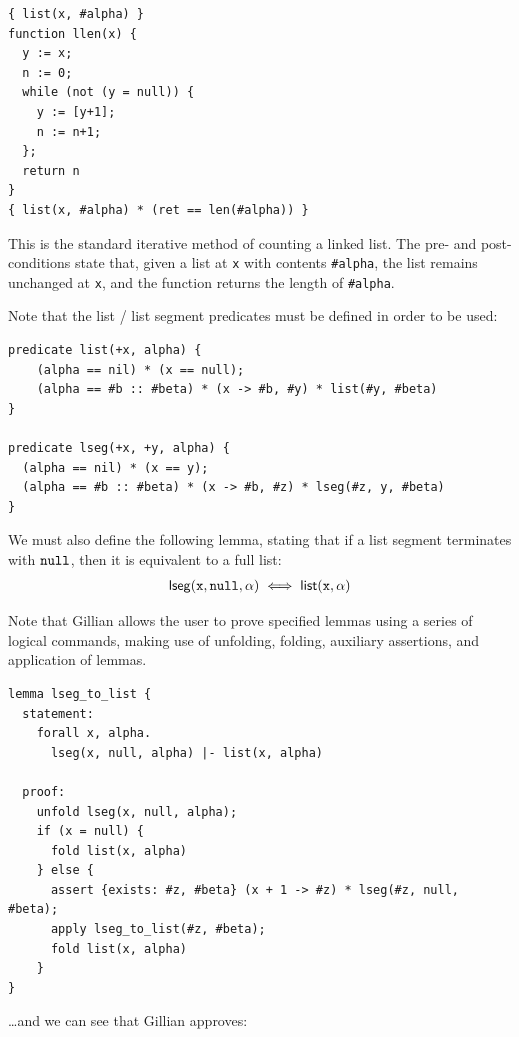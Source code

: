 \begin{lstlisting}[numbers=none, caption={Verification example - list length in WISL}, style=code]
{ list(x, #alpha) }
function llen(x) {
  y := x;
  n := 0;
  while (not (y = null)) {
    y := [y+1];
    n := n+1;
  };
  return n
}
{ list(x, #alpha) * (ret == len(#alpha)) }
\end{lstlisting}

This is the standard iterative method of counting a linked list. The pre- and
post-conditions state that, given a list at \texttt{x} with contents
\texttt{\#alpha}, the list remains unchanged at \texttt{x}, and the function
returns the length of \texttt{\#alpha}.

Note that the list / list segment predicates must be defined in order to be used:

\begin{lstlisting}[caption={List predicates in WISL}, style=code, numbers=none]
predicate list(+x, alpha) {
    (alpha == nil) * (x == null);
    (alpha == #b :: #beta) * (x -> #b, #y) * list(#y, #beta)
}

predicate lseg(+x, +y, alpha) {
  (alpha == nil) * (x == y);
  (alpha == #b :: #beta) * (x -> #b, #z) * lseg(#z, y, #beta)
}
\end{lstlisting}

We must also define the following lemma, stating that if a list segment
terminates with $\mathtt{null}$, then it is equivalent to a full list:
\begin{align*}
  \mathsf{lseg}(\mathtt{x}, \mathtt{null}, \alpha) \iff \mathsf{list}(\mathtt{x}, \alpha)
\end{align*}

Note that Gillian allows the user to prove specified lemmas using a series of
logical commands, making use of unfolding, folding, auxiliary assertions, and
application of lemmas.

\begin{lstlisting}[caption={List lemma in WISL}, style=code, numbers=none]
lemma lseg_to_list {
  statement:
    forall x, alpha.
      lseg(x, null, alpha) |- list(x, alpha)

  proof:
    unfold lseg(x, null, alpha);
    if (x = null) {
      fold list(x, alpha)
    } else {
      assert {exists: #z, #beta} (x + 1 -> #z) * lseg(#z, null, #beta);
      apply lseg_to_list(#z, #beta);
      fold list(x, alpha)
    }
}
\end{lstlisting}

\ldots and we can see that Gillian approves:

